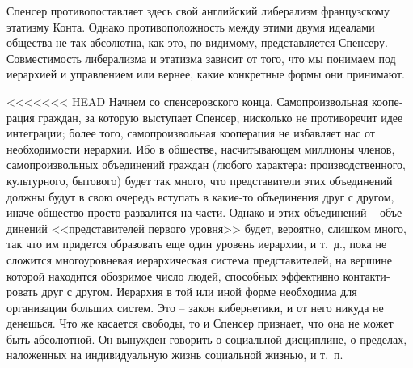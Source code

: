 \documentclass{book}
\begin{document}
Спенсер противопоставляет здесь свой английский либера­лизм французскому этатизму Конта. Однако противополож­ность между этими двумя идеалами общества не так абсолютна, как это, по-видимому, представляется Спенсеру. Совместимость либерализма и этатизма зависит от того, что мы понимаем под иерархией и управлением или вернее, какие конкретные формы они принимают.

<<<<<<< HEAD
Начнем со спенсеровского конца. Самопроизвольная коопе­рация граждан, за которую выступает Спенсер, нисколько не противоречит идее интеграции; более того, самопроизвольная кооперация не избавляет нас от необходимости  иерархии. Ибо в обществе, насчитывающем миллионы членов, самопроизволь­ных объединений граждан (любого характера: производствен­ного, культурного, бытового) будет так много, что предста­вители этих объединений должны будут в свою очередь всту­пать в какие‑то объединения друг с другом, иначе общество просто развалится на части. Однако и этих объединений -- объе­динений <<представителей первого уровня>> будет, вероятно, слишком много, так что им придется образовать еще один уро­вень иерархии, и т.~д., пока не сложится многоуровневая иерар­хическая система представителей, на вершине которой находит­ся обозримое число людей, способных эффективно контакти­ровать друг с другом. Иерархия в той или иной форме необ­ходима для организации больших систем. Это -- закон кибер­нетики, и от него никуда не денешься. Что же касается свободы, то и Спенсер признает, что она не может быть абсолютной. Он вынужден говорить о социальной дисциплине, о пределах, наложенных на индивидуальную жизнь социальной жизнью, и т.~п.
\end{document}
